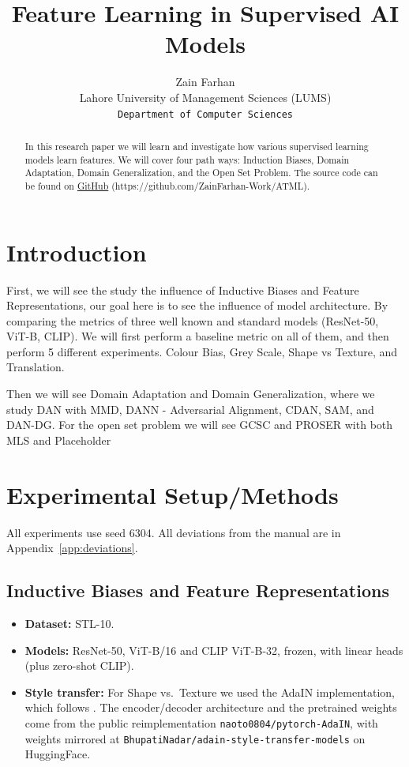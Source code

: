 \documentclass{article}
\title{Feature Learning in Supervised AI Models}
\author{
  Zain Farhan \\
  Lahore University of Management Sciences (LUMS) \\
  \texttt{Department of Computer Sciences} \\
}
\newenvironment{tight}{\begin{itemize}\setlength{\itemsep}{0pt}\setlength{\parsep}{0pt}\setlength{\topsep}{2pt}\setlength{\parskip}{0pt}}{\end{itemize}}
\begin{document}
\maketitle


\begin{abstract}
  In this research paper we will learn and investigate how various supervised learning models learn features. We will cover four path ways: Induction Biases, Domain Adaptation, Domain Generalization, and
  the Open Set Problem. The source code can be found on
  \href{https://github.com/ZainFarhan-Work/ATML}{GitHub} (https://github.com/ZainFarhan-Work/ATML).
\end{abstract}

\section{Introduction}
\label{sec:intro}

First, we will see the study the influence of Inductive Biases and Feature Representations, our goal here is to see the influence of model architecture.
By comparing the metrics of three well known and standard models (ResNet-50, ViT-B, CLIP). We will first perform a baseline metric on all of them, and then
perform 5 different experiments. Colour Bias, Grey Scale, Shape vs Texture, and Translation.

Then we will see Domain Adaptation and Domain Generalization, where we study DAN with MMD, DANN - Adversarial Alignment, CDAN, SAM, and DAN-DG. For the open set problem we will
see GCSC and PROSER with both MLS and Placeholder

\section{Experimental Setup/Methods}
\label{sec:setup}

All experiments use seed 6304. All deviations from the manual are in Appendix~\ref{app:deviations}.

\subsection{Inductive Biases and Feature Representations}
\begin{tight}
  \item \textbf{Dataset:} STL-10.
  \item \textbf{Models:} ResNet-50, ViT-B/16 and CLIP ViT-B-32, frozen, with linear heads (plus zero-shot CLIP).
  \item \textbf{Style transfer:} For Shape vs.\ Texture we used the AdaIN implementation, which follows \citet{huang2017adain}. The encoder/decoder architecture and the pretrained weights come from the public reimplementation \texttt{naoto0804/pytorch-AdaIN}, with weights mirrored at \texttt{BhupatiNadar/adain-style-transfer-models} on HuggingFace.
\end{tight}
\end{document}
